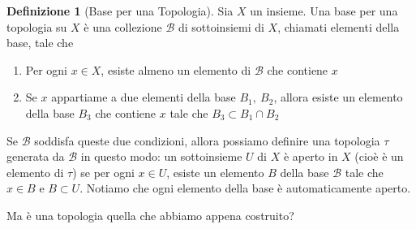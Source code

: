 \documentclass[10pt,a4paper]{article}
\theoremstyle{definition}
\newtheorem{defi}{Definizione}
\theoremstyle{plain}
\theoremstyle{remark}
\theoremstyle{remark}
\newcommand{\B}{\mathcal{B}}
\begin{document}


\begin{defi}[Base per una Topologia] Sia $X$ un insieme. Una base per una
topologia su $X$ è una collezione $\B$ di sottoinsiemi di $X$, chiamati elementi
della base, tale che
\begin{enumerate}
\item Per ogni $x \in X$, esiste almeno un elemento di $\B$ che contiene $x$
\item Se $x$ appartiame a due elementi della base $B_1, \ B_2$, allora esiste un
elemento della base $B_3$ che contiene $x$ tale che $B_3 \subset B_1 \cap B_2$
\end{enumerate}

Se $\B$ soddisfa queste due condizioni, allora possiamo definire una topologia
$\tau$ generata da $\B$ in questo modo: un sottoinsieme $U$ di $X$ è aperto in
$X$ (cioè è un elemento di $\tau$) se per ogni $x \in U$, esiste un elemento $B$
della base $\B$ tale che $x \in B$ e $B \subset U$. Notiamo che ogni elemento
della base è automaticamente aperto.
\end{defi}


Ma è una topologia quella che abbiamo appena costruito?
\end{document}
